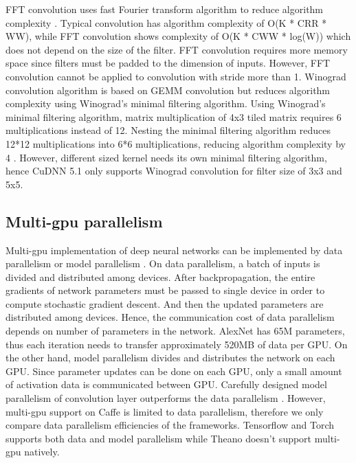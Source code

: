 FFT convolution uses fast Fourier transform algorithm to reduce algorithm complexity \cite{fftconv}.
Typical convolution has algorithm complexity of O(K * CRR * WW), while FFT convolution shows complexity of O(K * CWW * log(W)) which does not depend on the size of the filter.
FFT convolution requires more memory space since filters must be padded to the dimension of inputs.
However, FFT convolution cannot be applied to convolution with stride more than 1.
Winograd convolution algorithm is based on GEMM convolution but reduces algorithm complexity using Winograd's minimal filtering algorithm.
Using Winograd’s minimal filtering algorithm, matrix multiplication of 4x3 tiled matrix requires 6 multiplications instead of 12.
Nesting the minimal filtering algorithm reduces 12*12 multiplications into 6*6 multiplications, reducing algorithm complexity by 4 \cite{winograd}.
However, different sized kernel needs its own minimal filtering algorithm, hence CuDNN 5.1 only supports Winograd convolution for filter size of 3x3 and 5x5.

\subsection{Multi-gpu parallelism}
Multi-gpu implementation of deep neural networks can be implemented by data parallelism or model parallelism \cite{NIPS2012_4687}.
On data parallelism, a batch of inputs is divided and distributed among devices.
After backpropagation, the entire gradients of network parameters must be passed to single device in order to compute stochastic gradient descent.
And then the updated parameters are distributed among devices.
Hence, the communication cost of data parallelism depends on number of parameters in the network.
AlexNet has 65M parameters, thus each iteration needs to transfer approximately 520MB of data per GPU.
On the other hand, model parallelism divides and distributes the network on each GPU.
Since parameter updates can be done on each GPU, only a small amount of activation data is communicated between GPU.
Carefully designed model parallelism of convolution layer outperforms the data parallelism \cite{DBLP:journals/corr/YadanATR13}.
However, multi-gpu support on Caffe is limited to data parallelism, therefore we only compare data parallelism efficiencies of the frameworks.
Tensorflow and Torch supports both data and model parallelism while Theano doesn’t support multi-gpu natively.

